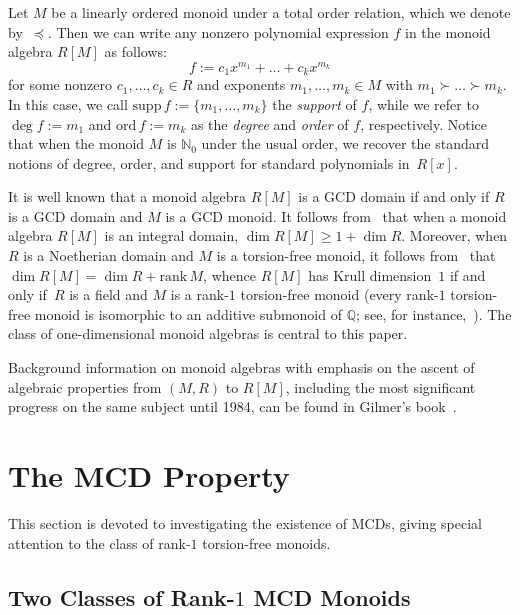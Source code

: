 \documentclass[10pt]{amsart}
\theoremstyle{definition}
\theoremstyle{remark}
\numberwithin{equation}{section}
\newcommand{\nn}{\mathbb{N}}
\newcommand{\qq}{\mathbb{Q}}
\begin{document}
Let $M$ be a linearly ordered monoid under a total order relation, which we denote by~$\preceq$. Then we can write any nonzero polynomial expression $f$ in the monoid algebra $R[M]$ as follows:
\[
  f := c_1 x^{m_1} + \dots + c_k x^{m_k}
\]
for some nonzero $c_1, \dots, c_k \in R$ and exponents $m_1, \dots, m_k \in M$ with $m_1 \succ \dots \succ m_k$. In this case, we call $\text{supp} \, f := \{m_1, \dots, m_k\}$ the \emph{support} of $f$, while we refer to $\deg f := m_1$ and $\text{ord} \, f := m_k$ as the \emph{degree} and \emph{order} of $f$, respectively. Notice that when the monoid $M$ is $\nn_0$ under the usual order, we recover the standard notions of degree, order, and support for standard polynomials in~$R[x]$. 
\smallskip

It is well known that a monoid algebra $R[M]$ is a GCD domain if and only if $R$ is a GCD domain and $M$ is a GCD monoid. It follows from~\cite[Proposition 8.3]{GP74} that when a monoid algebra $R[M]$ is an integral domain, $\dim R[M] \ge 1 + \dim R$. Moreover, when $R$ is a Noetherian domain and $M$ is a torsion-free monoid, it follows from~\cite[Corollary~2]{jO88} that $\dim R[M] = \dim R + \text{rank} \, M$, whence $R[M]$ has Krull dimension~$1$ if and only if~$R$ is a field and $M$ is a rank-$1$ torsion-free monoid (every rank-$1$ torsion-free monoid is isomorphic to an additive submonoid of $\qq$; see, for instance,~\cite[Section~24]{lF70}). The class of one-dimensional monoid algebras is central to this paper.
\smallskip

Background information on monoid algebras with emphasis on the ascent of algebraic properties from $(M,R)$ to $R[M]$, including the most significant progress on the same subject until 1984, can be found in Gilmer's book~\cite{rG84}.










\bigskip
\section{The MCD Property}
\label{sec:the MCD property}

This section is devoted to investigating the existence of MCDs, giving special attention to the class of rank-$1$ torsion-free monoids.

\medskip
\subsection{Two Classes of \texorpdfstring{Rank-$1$}{Rank-1} MCD Monoids}
\end{document}
